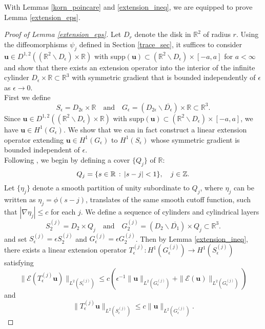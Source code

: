 \documentclass[11pt]{article}
\numberwithin{equation}{section}
\newcommand{\R}{\mathbb{R}}
\newcommand{\Z}{\mathbb{Z}}
\newcommand{\E}{\mathcal{E}}
\newcommand{\bu}{\bm{u}}
\newcommand{\ts}{\thinspace}
\theoremstyle{definition}
\begin{document}
With Lemmas \ref{korn_poincare} and \ref{extension_ineq}, we are equipped to prove Lemma \ref{extension_eps}.

\begin{proof}[Proof of Lemma \ref{extension_eps}]
Let $D_{r}$ denote the disk in $\R^2$ of radius $r$. Using the diffeomorphisms $\psi_j$ defined in Section \ref{trace_sec}, it suffices to consider $\bu\in D^{1,2}((\R^2\backslash D_{\epsilon})\times \R)$ with supp$(\bu)\subset (\R^2\backslash D_{\epsilon})\times [-a,a]$ for $a<\infty$ and show that there exists an extension operator into the interior of the infinite cylinder $D_{\epsilon}\times\R \subset\R^3$ with symmetric gradient that is bounded independently of $\epsilon$ as $\epsilon\to 0$. \\

First we define 
\[ S_{\epsilon} = D_{2\epsilon}\times \R \quad \text{and} \quad G_{\epsilon} = (D_{2\epsilon}\backslash \overline{D_{\epsilon}}) \times \R \subset \R^3. \]
Since $\bu\in D^{1,2}((\R^2\backslash D_{\epsilon})\times \R)$ with supp$(\bu)\subset (\R^2\backslash D_{\epsilon})\times [-a,a]$, we have $\bu\in H^1(G_{\epsilon})$. We show that we can in fact construct a linear extension operator extending $\bu\in H^1(G_{\epsilon})$ to $H^1(S_{\epsilon})$ whose symmetric gradient is bounded independent of $\epsilon$. \\

Following \cite{mazya1997differentiable}, we begin by defining a cover $\{Q_j\}$ of $\R$:
\[ Q_j = \{s \in \R \ts:\ts |s-j| <1 \}, \quad j\in \Z. \] 
Let $\{\eta_j\}$ denote a smooth partition of unity subordinate to $Q_j$, where $\eta_j$ can be written as $\eta_j= \phi(s-j)$, translates of the same smooth cutoff function, such that $|\nabla \eta_j|\le c$ for each $j$. We define a sequence of cylinders and cylindrical layers 
\[ S_{2}^{(j)} = D_{2}\times Q_j \quad \text{and} \quad G^{(j)}_{2} = (D_{2}\backslash \overline{D_1}) \times Q_j \subset \R^3. \]
and set $S^{(j)}_{\epsilon} = \epsilon S^{(j)}_{2}$ and $G^{(j)}_{\epsilon} = \epsilon G^{(j)}_{2}$. Then by Lemma \ref{extension_ineq}, there exists a linear extension operator $T_{\epsilon}^{(j)}: H^1(G^{(j)}_{\epsilon}) \to H^1(S^{(j)}_{\epsilon})$ satisfying
 \begin{equation}\label{ext_est_seq1}
 \|\E (T_{\epsilon}^{(j)}\bu) \|_{L^2(S^{(j)}_{\epsilon})} \le c\left(\epsilon^{-1}\|\bu\|_{L^2(G^{(j)}_{\epsilon})} + \|\E(\bu)\|_{L^2(G^{(j)}_{\epsilon})} \right)
 \end{equation}
and
 \begin{equation}\label{ext_est_seq2}
  \| T_{\epsilon}^{(j)}\bu \|_{L^2(S^{(j)}_{\epsilon})} \le c\|\bu\|_{L^2(G^{(j)}_{\epsilon})}.
  \end{equation}
 

\end{proof}
\end{document}
